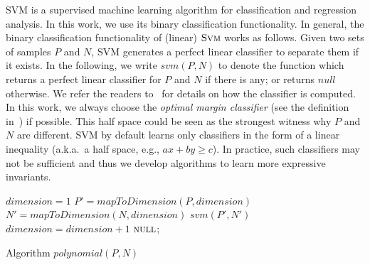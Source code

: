 SVM is a supervised machine learning algorithm for classification and regression analysis. In this work, we use its binary classification functionality. In general, the binary classification functionality of (linear) $\textsc{Svm}$ works as follows. Given two sets of samples $P$ and $N$, SVM generates a perfect linear classifier to separate them if it exists. In the following, we write $\mathit{svm}(P, N)$ to denote the function which returns a perfect linear classifier for $P$ and $N$ if there is any; or returns $\mathit{null}$ otherwise. We refer the readers to~\cite{svm} for details on how the classifier is computed. In this work, we always choose the \textit{optimal margin classifier} (see the definition in~\cite{Sharma2012}) if possible. This half space could be seen as the strongest witness why $P$ and $N$ are different. SVM by default learns only classifiers in the form of a linear inequality (a.k.a.~a half space, e.g., $a x + b y \geq c$). In practice, such classifiers may not be sufficient and thus we develop algorithms to learn more expressive invariants.

\begin{algorithm}[t]
\SetAlgoVlined
\Indm
\Indp
    $dimension = 1$\;
     {
        $P' = mapToDimension(P, dimension)$\;
        $N' = mapToDimension(N, dimension)$\;
         {
            \Return $svm(P', N')$\;
        }
    	$dimension = dimension + 1$\;
    }
    \Return $\textsc{null}$;
\caption{Algorithm $polynomial(P,N)$}
\label{alg:polynomialSVM}
\end{algorithm}

